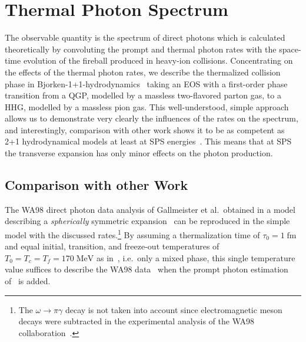 \documentclass[12pt,twoside,fleqn]{article}
\newcommand{\fm}{\mbox{fm}}
\newcommand{\MeV}{\mbox{MeV}}
\begin{document}
\section{Thermal Photon Spectrum}
\label{Thermal_Photon_Spectrum}
%
The observable quantity is the spectrum of direct photons which is calculated
theoretically by convoluting the prompt and thermal photon rates with the
space-time evolution of the fireball produced in heavy-ion collisions.
Concentrating on the effects of the thermal photon rates, we describe the
thermalized collision phase in
Bjorken-1+1-hydrodynamics~\cite{BJORKEN_1983,GYULASSY_1984} taking an EOS with a
first-order phase transition from a QGP, modelled by a massless two-flavored
parton gas, to a HHG, modelled by a massless pion gas. This well-understood,
simple approach allows us to demonstrate very clearly the influences of the
rates on the spectrum, and interestingly, comparison with other work shows it to
be as competent as 2+1 hydrodynamical models at least at SPS
energies~\cite{STEFFEN_1999}. This means that at SPS the transverse expansion
has only minor effects on the photon production.
%
\subsection{Comparison with other Work}
%
The WA98 direct photon data analysis of Gallmeister et al.\ obtained in a model
describing a {\em spherically} symmetric expansion~\cite{GALLMEISTER_2000} can
be reproduced in the simple model with the discussed rates.\footnote{The $\omega
  \rightarrow \pi \gamma$ decay is not taken into account since electromagnetic
  meson decays were subtracted in the experimental analysis of the WA98
  collaboration~\cite{PEITZMANN_2000_PC}.} By assuming a thermalization time of
$\tau_0 = 1\;\fm$ and equal initial, transition, and freeze-out temperatures of
$T_0 = T_c = T_f = 170\;\MeV$ as in~\cite{GALLMEISTER_2000}, i.e.\ only a mixed
phase, this single temperature value suffices to describe the WA98
data~\cite{WA80_1996,WA98_2000} when the prompt photon estimation
of~\cite{GALLMEISTER_2000} is added.
\end{document}

